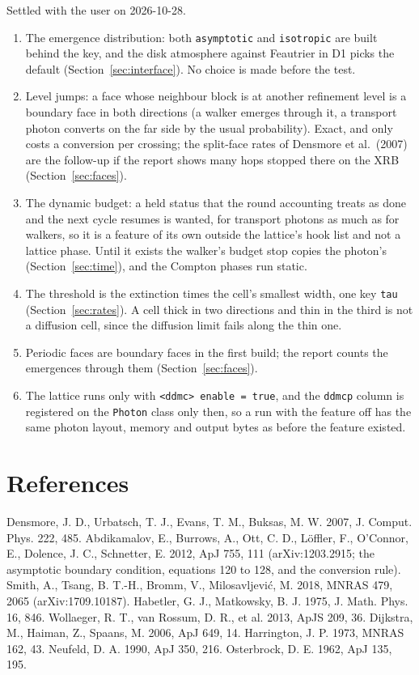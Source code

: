 \documentclass[11pt]{article}
\newcommand{\key}[1]{\texttt{#1}}
\begin{document}
Settled with the user on 2026-10-28.
\begin{enumerate}
\item The emergence distribution: both \key{asymptotic} and \key{isotropic} are built
  behind the key, and the disk atmosphere against Feautrier in D1 picks the default
  (Section~\ref{sec:interface}).  No choice is made before the test.
\item Level jumps: a face whose neighbour block is at another refinement level is a
  boundary face in both directions (a walker emerges through it, a transport
  photon converts on the far side by the usual probability).  Exact, and only costs a
  conversion per crossing; the split-face rates of Densmore et al.\ (2007) are the
  follow-up if the report shows many hops stopped there on the XRB
  (Section~\ref{sec:faces}).
\item The dynamic budget: a held status that the round accounting treats as done and
  the next cycle resumes is wanted, for transport photons as much as for walkers,
  so it is a feature of its own outside the lattice's hook list and not a lattice
  phase.  Until it exists the walker's budget stop copies the photon's
  (Section~\ref{sec:time}), and the Compton phases run static.
\item The threshold is the extinction times the cell's smallest width, one key
  \key{tau} (Section~\ref{sec:rates}).  A cell thick in two directions and thin in the
  third is not a diffusion cell, since the diffusion limit fails along the thin one.
\item Periodic faces are boundary faces in the first build; the report counts the
  emergences through them (Section~\ref{sec:faces}).
\item The lattice runs only with \key{<ddmc> enable = true}, and the \texttt{ddmcp}
  column is registered on the \texttt{Photon} class only then, so a run with the
  feature off has the same photon layout, memory and output bytes as before the
  feature existed.
\end{enumerate}

\section{References}

Densmore, J. D., Urbatsch, T. J., Evans, T. M., Buksas, M. W. 2007, J. Comput. Phys.
222, 485.  Abdikamalov, E., Burrows, A., Ott, C. D., L\"offler, F., O'Connor, E.,
Dolence, J. C., Schnetter, E. 2012, ApJ 755, 111 (arXiv:1203.2915; the asymptotic
boundary condition, equations 120 to 128, and the conversion rule).  Smith, A., Tsang,
B. T.-H., Bromm, V., Milosavljevi\'c, M. 2018, MNRAS 479, 2065 (arXiv:1709.10187).
Habetler, G. J., Matkowsky, B. J. 1975, J. Math. Phys. 16, 846.  Wollaeger, R. T.,
van Rossum, D. R., et al. 2013, ApJS 209, 36.  Dijkstra, M., Haiman, Z., Spaans, M. 2006, ApJ 649, 14.  Harrington, J. P. 1973, MNRAS
162, 43.  Neufeld, D. A. 1990, ApJ 350, 216.  Osterbrock, D. E. 1962, ApJ 135, 195.
\end{document}
